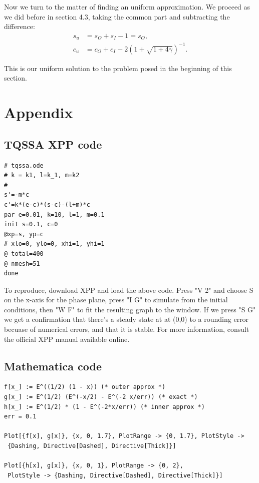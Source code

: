 \documentclass[12pt]{article}
\begin{document}
Now we turn to the matter of finding an uniform approximation. We
proceed as we did before in section 4.3, taking the common part and
subtracting the difference:
\begin{align}
s_u &= s_O + s_I - 1 = s_O, \\
c_u &= c_O + c_I - 2(1 + \sqrt{1+4\gamma})^{-1}.
\end{align}

This is our uniform solution to the problem posed in the beginning of
this section.

\newpage


\newpage
\section{Appendix}

\subsection{TQSSA XPP code}
\begin{verbatim}
# tqssa.ode
# k = k1, l=k_1, m=k2
#
s'=-m*c
c'=k*(e-c)*(s-c)-(l+m)*c
par e=0.01, k=10, l=1, m=0.1
init s=0.1, c=0
@xp=s, yp=c
# xlo=0, ylo=0, xhi=1, yhi=1
@ total=400
@ nmesh=51
done
\end{verbatim}

To reproduce, download XPP and load the above code. Press "V 2" and
choose S on the x-axis for the phase plane, press "I G" to simulate
from the initial conditions, then "W F" to fit the resulting graph to
the window. If we press "S G" we get a confirmation that there's a
steady state at at (0,0) to a rounding error becuase of numerical
errors, and that it is stable. For more information, consult the
official XPP manual available online.

\subsection{Mathematica code}
\begin{verbatim}
f[x_] := E^((1/2) (1 - x)) (* outer approx *)
g[x_] := E^(1/2) (E^(-x/2) - E^(-2 x/err)) (* exact *)
h[x_] := E^(1/2) * (1 - E^(-2*x/err)) (* inner approx *)
err = 0.1

Plot[{f[x], g[x]}, {x, 0, 1.7}, PlotRange -> {0, 1.7}, PlotStyle ->
 {Dashing, Directive[Dashed], Directive[Thick]}]

Plot[{h[x], g[x]}, {x, 0, 1}, PlotRange -> {0, 2}, 
 PlotStyle -> {Dashing, Directive[Dashed], Directive[Thick]}]
\end{verbatim}
\end{document}
